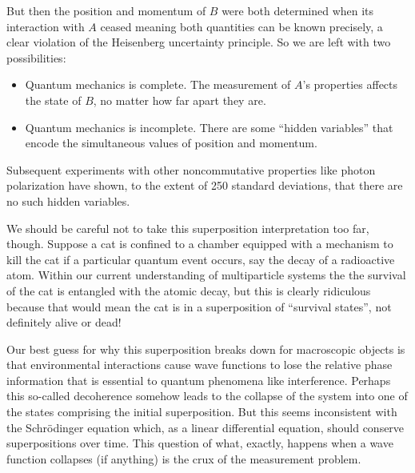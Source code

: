 \documentclass[../p052main.tex]{subfiles}
\begin{document}
But then the position and momentum of $B$ were both determined when its interaction with $A$ ceased meaning both quantities can be known precisely, a clear violation of the Heisenberg uncertainty principle.
So we are left with two possibilities:
\begin{itemize}
    \item Quantum mechanics is complete.
    The measurement of $A$'s properties affects the state of $B$, no matter how far apart they are.
    \item Quantum mechanics is incomplete.
    There are some ``hidden variables'' that encode the simultaneous values of position and momentum.
\end{itemize}
Subsequent experiments with other noncommutative properties like photon polarization have shown, to the extent of 250 standard deviations, that there are no such hidden variables.

We should be careful not to take this superposition interpretation too far, though.
Suppose a cat is confined to a chamber equipped with a mechanism to kill the cat if a particular quantum event occurs, say the decay of a radioactive atom.
Within our current understanding of multiparticle systems the the survival of the cat is entangled with the atomic decay, but this is clearly ridiculous because that would mean the cat is in a superposition of ``survival states'', not definitely alive or dead!

Our best guess for why this superposition breaks down for macroscopic objects is that environmental interactions cause wave functions to lose the relative phase information that is essential to quantum phenomena like interference.
Perhaps this so-called decoherence somehow leads to the collapse of the system into one of the states comprising the initial superposition.
But this seems inconsistent with the Schrödinger equation which, as a linear differential equation, should conserve superpositions over time.
This question of what, exactly, happens when a wave function collapses (if anything) is the crux of the measurement problem.
\end{document}
